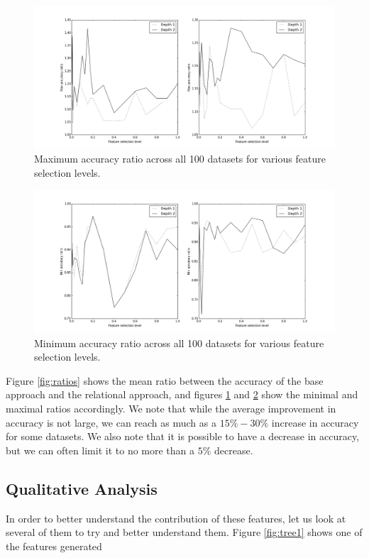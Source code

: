 \documentclass{article}
\theoremstyle{definition}
\begin{document}
\begin{figure}[h!]
	\centering
	\includegraphics[scale=0.4, keepaspectratio=true]{ratios_max.png}
	\caption{Maximum accuracy ratio across all 100 datasets for various feature selection levels.}
	\label{fig:ratios_max}
\end{figure}

\begin{figure}[h!]
	\centering
	\includegraphics[scale=0.4, keepaspectratio=true]{ratios_min.png}
	\caption{Minimum accuracy ratio across all 100 datasets for various feature selection levels.}
	\label{fig:ratios_min}
\end{figure}

Figure \ref{fig:ratios} shows the mean ratio between the accuracy of the base approach and the relational approach, and figures \ref{fig:ratios_max} and \ref{fig:ratios_min} show the minimal and maximal ratios accordingly. We note that while the average improvement in accuracy is not large, we can reach as much as a $15\%-30\%$ increase in accuracy for some datasets. We also note that it is possible to have a decrease in accuracy, but we can often limit it to no more than a $5\%$ decrease.

\subsection{Qualitative Analysis}
In order to better understand the contribution of these features, let us look at several of them to try and better understand them. Figure \ref{fig:tree1} shows one of the features generated %
\end{document}

